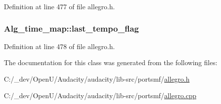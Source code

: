 Definition at line 477 of file allegro.\+h.

\subsubsection[{\texorpdfstring{last\+\_\+tempo\+\_\+flag}{last_tempo_flag}}]{ Alg\+\_\+time\+\_\+map\+::last\+\_\+tempo\+\_\+flag}\hypertarget{class_alg__time__map_a2b5a61fef806c24c7243801c6ba031b4}{}\label{class_alg__time__map_a2b5a61fef806c24c7243801c6ba031b4}


Definition at line 478 of file allegro.\+h.



The documentation for this class was generated from the following files\+:\begin{DoxyCompactItemize}
\item 
C\+:/\+\_\+dev/\+Open\+U/\+Audacity/audacity/lib-\/src/portsmf/\hyperlink{allegro_8h}{allegro.\+h}\item 
C\+:/\+\_\+dev/\+Open\+U/\+Audacity/audacity/lib-\/src/portsmf/\hyperlink{allegro_8cpp}{allegro.\+cpp}\end{DoxyCompactItemize}
